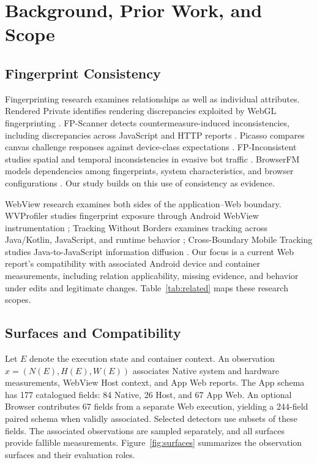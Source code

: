 \hypertarget{sec:2}{%
\section{Background, Prior Work, and Scope}\label{sec:2}}

\hypertarget{sec:2-1}{%
\subsection{Fingerprint Consistency}\label{sec:2-1}}

Fingerprinting research examines relationships as well as individual attributes. Rendered Private identifies rendering discrepancies exploited by WebGL fingerprinting \cite{ref17}. FP-Scanner detects countermeasure-induced inconsistencies, including discrepancies across JavaScript and HTTP reports \cite{ref04}. Picasso compares canvas challenge responses against device-class expectations \cite{ref05}. FP-Inconsistent studies spatial and temporal inconsistencies in evasive bot traffic \cite{ref06}. BrowserFM models dependencies among fingerprints, system characteristics, and browser configurations \cite{ref07}. Our study builds on this use of consistency as evidence.

WebView research examines both sides of the application--Web boundary. WVProfiler studies fingerprint exposure through Android WebView instrumentation \cite{ref08}; Tracking Without Borders examines tracking across Java/Kotlin, JavaScript, and runtime behavior \cite{ref09}; Cross-Boundary Mobile Tracking studies Java-to-JavaScript information diffusion \cite{ref10}. Our focus is a current Web report's compatibility with associated Android device and container measurements, including relation applicability, missing evidence, and behavior under edits and legitimate changes. Table~\ref{tab:related} maps these research scopes.


\hypertarget{sec:2-2}{%
\subsection{Surfaces and Compatibility}\label{sec:2-2}}

Let \(E\) denote the execution state and container context. An observation \(x = (N(E), H(E), W(E))\) associates Native system and hardware measurements, WebView Host context, and App Web reports. The App schema has 177 catalogued fields: 84 Native, 26 Host, and 67 App Web. An optional Browser contributes 67 fields from a separate Web execution, yielding a 244-field paired schema when validly associated. Selected detectors use subsets of these fields. The associated observations are sampled separately, and all surfaces provide fallible measurements. Figure~\ref{fig:surfaces} summarizes the observation surfaces and their evaluation roles.

